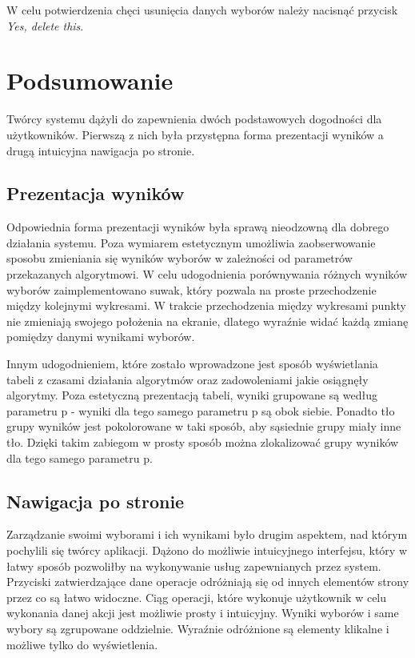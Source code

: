 \documentclass[pdflatex,11pt]{../aghdoc_version2}
\newlength\tindent
\renewcommand{\indent}{\hspace*{\tindent}}
\begin{document}
\vspace{\baselineskip}
W celu potwierdzenia chęci usunięcia danych wyborów należy nacisnąć przycisk \textit{Yes, delete this}.

\chapter{Podsumowanie}
\label{cha:podsumowanie}

Twórcy systemu dążyli do zapewnienia dwóch podstawowych dogodności dla użytkowników. Pierwszą z nich była przystępna forma prezentacji wyników a drugą intuicyjna nawigacja po stronie.

\section{Prezentacja wyników}
Odpowiednia forma prezentacji wyników była sprawą nieodzowną dla dobrego działania systemu. Poza wymiarem estetycznym umożliwia zaobserwowanie sposobu zmieniania się wyników wyborów w zależności od parametrów przekazanych algorytmowi. W celu udogodnienia porównywania różnych wyników wyborów zaimplementowano suwak, który pozwala na proste przechodzenie między kolejnymi wykresami. W trakcie przechodzenia między wykresami punkty nie zmieniają swojego położenia na ekranie, dlatego wyraźnie widać każdą zmianę pomiędzy danymi wynikami wyborów.
 
\indent Innym udogodnieniem, które zostało wprowadzone jest sposób wyświetlania tabeli z czasami działania algorytmów oraz zadowoleniami jakie osiągnęły algorytmy. Poza estetyczną prezentacją tabeli, wyniki grupowane są według parametru p - wyniki dla tego samego parametru p są obok siebie. Ponadto tło grupy wyników jest pokolorowane w taki sposób, aby sąsiednie grupy miały inne tło. Dzięki takim zabiegom w prosty sposób można zlokalizować grupy wyników dla tego samego parametru p.

\section{Nawigacja po stronie}

Zarządzanie swoimi wyborami i ich wynikami było drugim aspektem, nad którym pochylili się twórcy aplikacji. Dążono do możliwie intuicyjnego interfejsu, który w łatwy sposób pozwoliłby na wykonywanie usług zapewnianych przez system. Przyciski zatwierdzające dane operacje odróżniają się od innych elementów strony przez co są łatwo widoczne. Ciąg operacji, które wykonuje użytkownik w celu wykonania danej akcji jest możliwie prosty i intuicyjny. Wyniki wyborów i same wybory są zgrupowane oddzielnie. Wyraźnie odróżnione są elementy klikalne i możliwe tylko do wyświetlenia.

\newpage
\cleardoublepage
{}
\listoffigures




\end{document}
